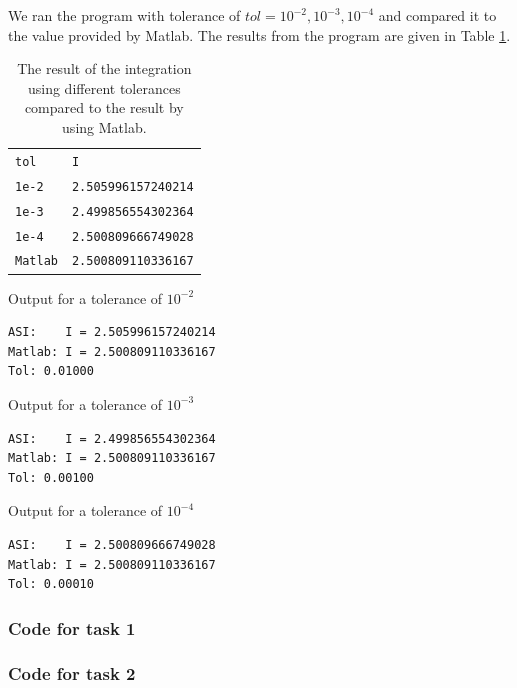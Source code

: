 \documentclass[a4paper,10pt]{article}
\begin{document}
We ran the program with tolerance of $tol=10^{-2}, 10^{-3}, 10^{-4}$ 
and compared it to the value provided by Matlab. The results from the program are given in
Table \ref{TABtask2}.
\begin{table}[!ht]
\centering 
  \begin{minipage}[t]{105mm}
    \caption{
      The result of the integration using different tolerances compared to the
      result by using Matlab.
    } 
    \label{TABtask2}
  \end{minipage}

  \vspace{5mm}
  \begin{tabular}{l l} 
    \texttt{tol}		&    \texttt{I} \\
    \texttt{1e-2}        & \texttt{2.505996157240214}	\\
    \texttt{1e-3}	& \texttt{2.499856554302364}	\\
    \texttt{1e-4}	& \texttt{2.500809666749028}	\\
    \texttt{Matlab}      & \texttt{2.500809110336167}  \\
  \end{tabular}
\end{table}
\FloatBarrier
\noindent Output for a tolerance of $10^{-2}$
\begin{center}
\begin{minipage}[t]{85mm}
\begin{lstlisting}
ASI:    I = 2.505996157240214
Matlab: I = 2.500809110336167
Tol: 0.01000
\end{lstlisting}
\end{minipage}
\end{center}
Output for a tolerance of $10^{-3}$
\begin{center}
\begin{minipage}[t]{85mm}
\begin{lstlisting}
ASI:    I = 2.499856554302364
Matlab: I = 2.500809110336167
Tol: 0.00100
\end{lstlisting}
\end{minipage}
\end{center}
Output for a tolerance of $10^{-4}$
\begin{center}
\begin{minipage}[t]{85mm}
\begin{lstlisting}
ASI:    I = 2.500809666749028
Matlab: I = 2.500809110336167
Tol: 0.00010
\end{lstlisting}
\end{minipage}
\end{center}

\newpage
\subsubsection*{Code for task 1}



\newpage
\subsubsection*{Code for task 2}

\end{document}
